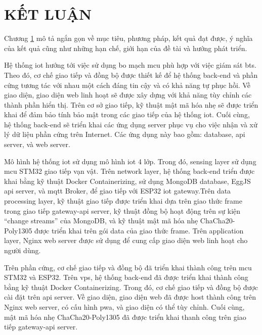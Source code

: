 \chapter{KẾT LUẬN}
\label{Chapter5}

Chương \ref{Chapter5} mô tả ngắn gọn về mục tiêu, phương pháp, kết quả đạt được, ý nghĩa của kết quả cũng như những hạn chế, giới hạn của đề tài và hướng phát triển.

Hệ thống \acrshort{iot} hướng tới việc sử dụng bo mạch \acrshort{mcu} phù hợp với việc giám sát \acrshort{bts}. Theo đó, cơ chế giao tiếp và đồng bộ được thiết kế để hệ thống back-end và phần cứng tương tác với nhau một cách đáng tin cậy và có khả năng tự phục hồi. Về giao diện, giao diện web linh hoạt sẽ được xây dựng với khả năng tùy chỉnh các thành phần hiển thị. Trên cơ sở giao tiếp, kỹ thuật mật mã hóa nhẹ sẽ được triển khai để đảm bảo tính bảo mật trong các giao tiếp của hệ thống \acrshort{iot}. Cuối cùng, hệ thống back-end sẽ triển khai các ứng dụng server phục vụ cho việc nhận và xử lý dữ liệu phần cứng trên Internet. Các ứng dụng này bao gồm: database, \acrshort{api} server, và web server.

Mô hình hệ thống \acrshort{iot} sử dụng mô hình \acrshort{iot} 4 lớp. Trong đó, sensing layer sử dụng \acrshort{mcu} STM32 giao tiếp vạn vật. Trên network layer, hệ thống back-end triển được khai bằng kỹ thuật Docker Containerizing, sử dụng MongoDB database, EggJS \acrshort{api} server, và \acrshort{mqtt} Broker, để giao tiếp với ESP32 \acrshort{iot} gateway.Trên data processing layer, kỹ thuật giao tiếp được triển khai dựa trên giao thức frame trong giao tiếp gateway-\acrshort{api} server, kỹ thuật đồng bộ hoạt động trên sự kiện ``change streams'' của MongoDB, và kỹ thuật mật mã hóa nhẹ ChaCha20-Poly1305 được triển khai trên gói data của giao thức frame. Trên application layer, Nginx web server được sử dụng để cung cấp giao diện web linh hoạt cho người dùng.

Trên phần cứng, cơ chế giao tiếp và đồng bộ đã triển khai thành công trên \acrshort{mcu} STM32 và ESP32. Trên \acrshort{vps}, hệ thống back-end đã được triển khai thành công bằng kỹ thuật Docker Containerizing. Trong đó, cơ chế giao tiếp và đồng bộ được cài đặt trên \acrshort{api} server. Về giao diện, giao diện web đã được host thành công trên Nginx web server, có cấu hình \acrshort{pwa}, và giao diện có thể tùy chỉnh. Cuối cùng, mật mã hóa nhẹ ChaCha20-Poly1305 đã được triển khai thanh công trên giao tiếp gateway-\acrshort{api} server.


